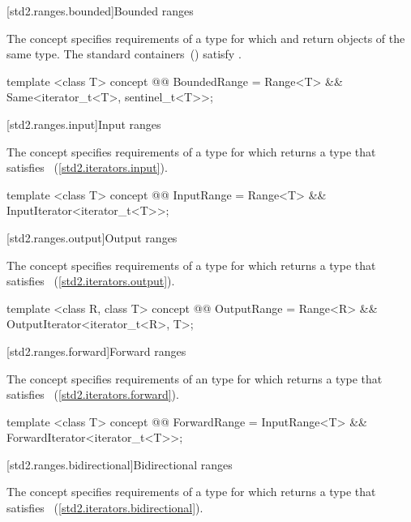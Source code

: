 [std2.ranges.bounded]{Bounded ranges}

\pnum
The  concept specifies requirements
of a  type for which  and  return objects of
the same type. \enternote The standard containers~()
satisfy .\exitnote

\begin{codeblock}
template <class T>
concept @@ BoundedRange =
  Range<T> && Same<iterator_t<T>, sentinel_t<T>>;
\end{codeblock}

[std2.ranges.input]{Input ranges}

\pnum
The  concept specifies requirements of
a  type for which  returns a type
that satisfies ~(\ref{std2.iterators.input}).

\begin{codeblock}
template <class T>
concept @@ InputRange =
  Range<T> && InputIterator<iterator_t<T>>;
\end{codeblock}

[std2.ranges.output]{Output ranges}

\pnum
The  concept specifies requirements of
a  type for which  returns a type that satisfies
~(\ref{std2.iterators.output}).

\begin{codeblock}
template <class R, class T>
concept @@ OutputRange =
  Range<R> && OutputIterator<iterator_t<R>, T>;
\end{codeblock}

[std2.ranges.forward]{Forward ranges}

\pnum
The  concept specifies requirements of an
 type for which  returns a type that satisfies
~(\ref{std2.iterators.forward}).

\begin{codeblock}
template <class T>
concept @@ ForwardRange =
  InputRange<T> && ForwardIterator<iterator_t<T>>;
\end{codeblock}

[std2.ranges.bidirectional]{Bidirectional ranges}

\pnum
The  concept specifies requirements of a
 type for which  returns a type that satisfies
~(\ref{std2.iterators.bidirectional}).


